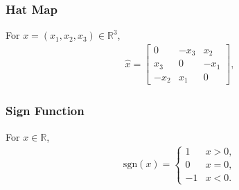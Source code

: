 \documentclass[10pt]{article}
\renewcommand{\Re}{\ensuremath{\mathbb{R}}}
\begin{document}
\subsubsection*{Hat Map}

For $x=(x_1,x_2,x_3)\in\Re^3$, 
\begin{align}
    \hat x = \begin{bmatrix}
        0 & -x_3 & x_2 \\
        x_3 & 0 & -x_1 \\
        -x_2 & x_1 & 0 
    \end{bmatrix},
\end{align}


\subsubsection*{Sign Function}

For $x\in\Re$, 
\begin{align}
    \mathrm{sgn}(x) =
    \begin{cases}
        1 &  x>0,\\
        0 &  x=0,\\
        -1 & x<0.
    \end{cases}
\end{align}
\end{document}
